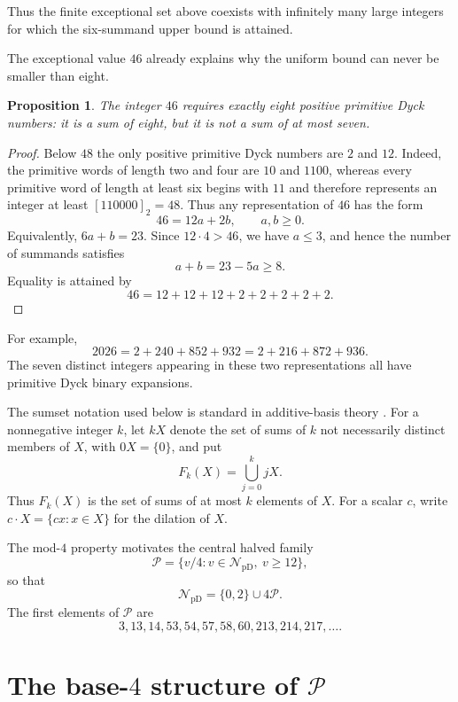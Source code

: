 \documentclass[12pt]{article}
\theoremstyle{plain}
\newtheorem{proposition}[theorem]{Proposition}
\theoremstyle{definition}
\theoremstyle{plain}
\newcommand{\NpD}{\mathcal{N}_{\mathrm{pD}}}
\newcommand{\Pset}{\mathcal{P}}
\begin{document}
Thus the finite exceptional set above coexists with infinitely many large
integers for which the six-summand upper bound is attained.

The exceptional value $46$ already explains why the uniform bound can
never be smaller than eight.

\begin{proposition}\label{prop:46}
The integer $46$ requires exactly eight positive primitive Dyck numbers:
it is a sum of eight, but it is not a sum of at most seven.
\end{proposition}

\begin{proof}
Below $48$ the only positive primitive Dyck numbers are $2$ and $12$.
Indeed, the primitive words of length two and four are $10$ and $1100$,
whereas every primitive word of length at least six begins with $11$ and
therefore represents an integer at least $[110000]_2=48$.  Thus any
representation of $46$ has the form
\[
        46=12a+2b,\qquad a,b\geq0.
\]
Equivalently, $6a+b=23$.  Since $12\cdot4>46$, we have $a\leq3$, and
hence the number of summands satisfies
\[
        a+b=23-5a\geq8.
\]
Equality is attained by
\[
        46=12+12+12+2+2+2+2+2.
\]
\end{proof}

For example,
\[
 2026=2+240+852+932=2+216+872+936.
\]
The seven distinct integers appearing in these two representations all
have primitive Dyck binary expansions.

The sumset notation used below is standard in additive-basis theory
\cite[Chap.\ 1]{Nathanson}.  For a nonnegative integer $k$, let $kX$ denote the
set of sums of $k$ not necessarily distinct members of $X$, with
$0X=\{0\}$, and put
\[
 F_k(X)=\bigcup_{j=0}^{k}jX.
\]
Thus $F_k(X)$ is the set of sums of at most $k$ elements of $X$.  For a scalar
$c$, write $c\cdot X=\{cx:x\in X\}$ for the dilation of $X$.

The mod-$4$ property motivates the central halved family
\begin{equation}\label{eq:P-def}
 \Pset=\{v/4:v\in\NpD,\ v\geq12\},
\end{equation}
so that
\begin{equation}\label{eq:NpD-decomp}
 \NpD=\{0,2\}\cup4\Pset.
\end{equation}
The first elements of $\Pset$ are
\[
 3,13,14,53,54,57,58,60,213,214,217,\ldots.
\]


\section{The base-\texorpdfstring{$4$}{4} structure of
\texorpdfstring{$\Pset$}{P}}\label{sec:base4}
\end{document}
